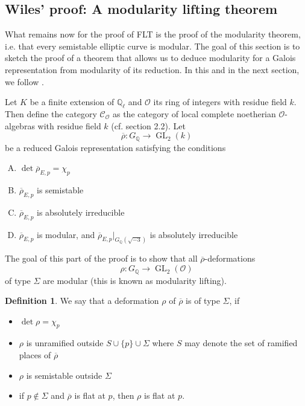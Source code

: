 \documentclass{article}
\theoremstyle{plain}%
\theoremstyle{definition}
\newtheorem{definition}[theorem]{Definition}
\theoremstyle{remark}
\newcommand{\co}{\mathcal{C}_\mathcal{O}}
\newcommand{\GL}{\operatorname{GL}}
\begin{document}
\subsection{Wiles' proof: A modularity lifting theorem}
What remains now for the proof of FLT is the proof of the modularity theorem, i.e. that every semistable
elliptic curve is modular.
The goal of this section is to sketch the proof of a theorem that allows us to deduce modularity for
a Galois representation from modularity of its reduction.
In this and in the next section, we follow \cite[chapter 1, \S 7]{Cornell1997}.

Let \(K\) be a finite extension of \(\mathbb{Q}_\ell\) and \(\mathcal{O}\) its ring of integers with residue field \(k\).
Then define the category \(\co\) as the category of local complete noetherian \(\mathcal{O}\)-algebras 
with residue field \(k\) (cf. section 2.2).
Let
\[
    \overline{\rho}\colon G_\mathbb{Q} \to \GL_2(k)
\]
be a reduced Galois representation satisfying the conditions
\begin{enumerate}[(A)]
    \item \(\det \overline{\rho}_{E,p} = \chi_p\)
    \item \(\overline{\rho}_{E,p}\) is semistable
    \item \(\overline{\rho}_{E,p}\) is absolutely irreducible
    \item \(\overline{\rho}_{E,p}\) is modular, and \(\overline{\rho}_{E,p}|_{G_\mathbb{Q}(\sqrt{-3})}\) is absolutely irreducible
\end{enumerate}

The goal of this part of the proof is to show that all \(\overline{\rho}\)-deformations
\[
    \rho\colon G_\mathbb{Q} \to \GL_2(\mathcal{O})
\]
 of type \(\Sigma\) are modular (this is known as modularity lifting).

\begin{definition}\cite[see][chapter 1, paragraph 7.2]{Cornell1997}
We say that a deformation \(\rho\) of \(\overline{\rho}\) is of type \(\Sigma\), if
\begin{itemize}
    \item \(\det \rho = \chi_p\)
    \item \(\rho\) is unramified outside \(S \cup \{p\} \cup \Sigma\) where \(S\) 
    may denote the set of ramified places of \(\overline{\rho}\)
    \item \(\rho\) is semistable outside \(\Sigma\)
    \item if \(p \not \in \Sigma\) and \(\overline{\rho}\) is flat at \(p\), then \(\rho\) is flat at \(p\).
\end{itemize}
\end{definition}
\end{document}
